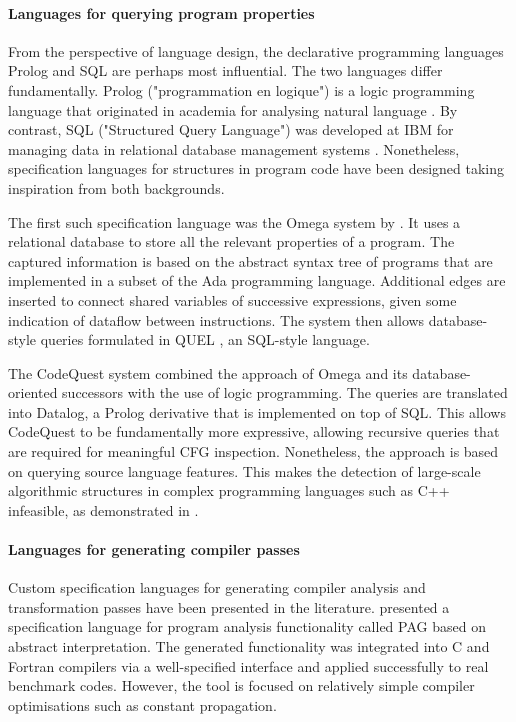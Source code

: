    \paragraph*{Languages for querying program properties}
    From the perspective of language design, the declarative programming
    languages Prolog and SQL are perhaps most influential.
    The two languages differ fundamentally.
    Prolog ("programmation en logique") is a logic programming language that
    originated in academia for analysing natural language
    \citep{Colmerauer:1993:BP:154766.155362}.
    By contrast, SQL ("Structured Query Language") was developed at IBM for
    managing data in relational database management systems
    \citep{Chamberlin:1974:SSE:800296.811515}.
    Nonetheless, specification languages for structures in program code have
    been designed taking inspiration from both backgrounds.

    The first such specification language was the Omega system by
    \citet{Linton:CSD-83-164}.
    It uses a relational database to store all the relevant properties of a
    program.
    The captured information is based on the abstract syntax tree of programs
    that are implemented in a subset of the Ada programming language.
    Additional edges are inserted to connect shared variables of
    successive expressions, given some indication of dataflow between
    instructions.
    The system then allows database-style queries formulated in QUEL
    \citep{Stonebraker:1976:DII:320473.320476}, an SQL-style language.

    The CodeQuest system \citep{Hajiyev:2006:CSS:2171327.2171331} combined the
    approach of Omega and its database-oriented successors with the use of logic
    programming.
    The queries are translated into Datalog, a Prolog derivative that is
    implemented on top of SQL.
    This allows CodeQuest to be fundamentally more expressive, allowing
    recursive queries that are required for meaningful CFG inspection.
    Nonetheless, the approach is based on querying source language features.
    This makes the detection of large-scale algorithmic structures in complex
    programming languages such as C++ infeasible, as demonstrated in
    .

    \paragraph*{Languages for generating compiler passes}
    Custom specification languages for generating compiler analysis and
    transformation passes have been presented in the literature.
    \citet{Martin1998} presented a specification language for program analysis
    functionality called PAG based on abstract interpretation.
    The generated functionality was integrated into C and Fortran compilers via
    a well-specified interface and applied successfully to real benchmark codes.
    However, the tool is focused on relatively simple compiler optimisations
    such as constant propagation.

